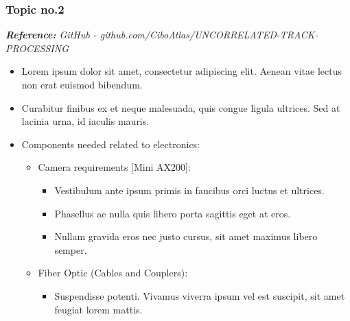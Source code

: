 \documentclass[11pt,letterpaper]{article}
\begin{document}
\subsubsection{Topic no.2}
\textit{\footnotesize{\textbf{Reference:} GitHub - github.com/CiboAtlas/UNCORRELATED-TRACK-PROCESSING}} \\ 
\begin{itemize} %
	\item Lorem ipsum dolor sit amet, consectetur adipiscing elit. Aenean vitae lectus non erat euismod bibendum.
	\item Curabitur finibus ex et neque malesuada, quis congue ligula ultrices. Sed at lacinia urna, id iaculis mauris.
	\item Components needed related to electronics:
	\begin{itemize}[label=$-$] %
		\item Camera requirements [Mini AX200]: 
			\begin{itemize} %
			\item Vestibulum ante ipsum primis in faucibus orci luctus et ultrices.
			\item Phasellus ac nulla quis libero porta sagittis eget at eros.
			\item Nullam gravida eros nec justo cursus, sit amet maximus libero semper.
			\end{itemize}
			
		\item Fiber Optic (Cables and Couplers): 
			\begin{itemize} %
			\item Suspendisse potenti. Vivamus viverra ipsum vel est suscipit, sit amet feugiat lorem mattis.
			\end{itemize}
	\end{itemize}
\end{itemize}
\end{document}
